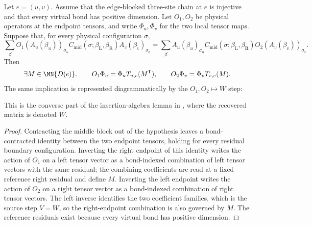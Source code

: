 \begin{theorem}%
    \label{thm:peps_physical_to_virtual_insertion}
    \leanok
    Let $e=(u,v)$. Assume that the edge-blocked three-site chain at $e$ is
    injective and that every virtual bond has positive dimension. Let $O_1,O_2$
    be physical operators at the endpoint tensors, and
    write $\Phi_u,\Phi_v$ for the two local tensor maps. Suppose that, for every
    physical configuration $\sigma$,
    \[
        \sum_{\beta}
        O_1(A_u(\beta_u))_{\sigma_u}
        C_{\mathrm{mid}}(\sigma;\beta_{\mathrm{L}},\beta_{\mathrm{R}})
        A_v(\beta_v)_{\sigma_v}
        =
        \sum_{\beta}
        A_u(\beta_u)_{\sigma_u}
        C_{\mathrm{mid}}(\sigma;\beta_{\mathrm{L}},\beta_{\mathrm{R}})
        O_2(A_v(\beta_v))_{\sigma_v}.
    \]
    Then
    \[
        \exists M\in\MN{D(e)},\qquad
        O_1\Phi_u=\Phi_uT_{u,e}(M^{\mathsf T}),
        \qquad
        O_2\Phi_v=\Phi_vT_{v,e}(M).
    \]
    The same implication is represented diagrammatically by the
    $O_1,O_2\mapsto W$ step:
    \begin{center}
        \TNPEPSPhysicalToVirtualInsertion
    \end{center}
    This is the converse part of the insertion-algebra lemma in
    \cite[Section~3]{Molnar2018NormalPEPS}, where the recovered matrix is
    denoted $W$.
\end{theorem}
\begin{proof}\leanok
    Contracting the middle block out of the hypothesis leaves a bond-contracted
    identity between the two endpoint tensors, holding for every residual
    boundary configuration. Inverting the right endpoint of this identity writes
    the action of $O_1$ on a left tensor vector as a bond-indexed combination of
    left tensor vectors with the same residual; the combining coefficients are
    read at a fixed reference right residual and define $M$. Inverting the left
    endpoint writes the action of $O_2$ on a right tensor vector as a bond-indexed
    combination of right tensor vectors. The left inverse identifies the two
    coefficient families, which is the source step $V=W$, so the right-endpoint
    combination is also governed by $M$. The reference residuals exist because
    every virtual bond has positive dimension.
\end{proof}

